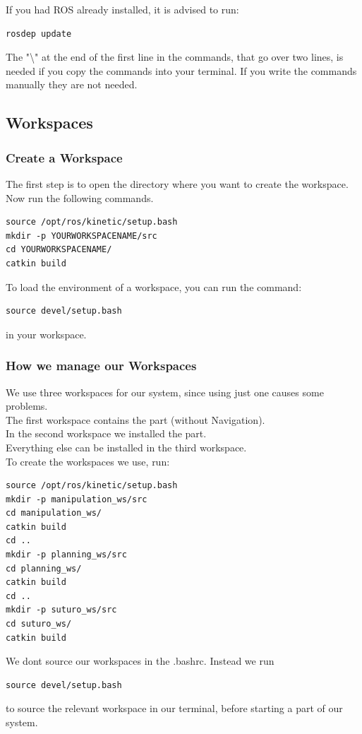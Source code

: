 \documentclass[main.tex]{subfiles}
\begin{document}
If you had ROS already installed, it is advised to run:
\begin{lstlisting}
rosdep update
\end{lstlisting}
The "\textbackslash" at the end of the first line in the commands, that go over two lines, is needed if you copy the commands into your terminal. If you write the commands manually they are not needed.
	
	\subsection{Workspaces}
	\subsubsection{Create a Workspace}
	The first step is to open the directory where you want to create the workspace.\\
	Now run the following commands.
	\begin{lstlisting}
source /opt/ros/kinetic/setup.bash
mkdir -p YOURWORKSPACENAME/src
cd YOURWORKSPACENAME/
catkin build 
\end{lstlisting}
	
	To load the environment of a workspace, you can run the command:
	\begin{lstlisting}
source devel/setup.bash
\end{lstlisting}
	in your workspace.
	
	\subsubsection{How we manage our Workspaces} \label{workspace_management}
	
	We use three workspaces for our system, since using just one causes some problems.\\
	The first workspace contains the  part (without Navigation).\\
	In the second workspace we installed the  part.\\
	Everything else can be installed in the third workspace.\\
	To create the workspaces we use, run:\\
	\begin{lstlisting}
source /opt/ros/kinetic/setup.bash
mkdir -p manipulation_ws/src
cd manipulation_ws/
catkin build 
cd ..
mkdir -p planning_ws/src
cd planning_ws/
catkin build 
cd ..
mkdir -p suturo_ws/src
cd suturo_ws/
catkin build 
\end{lstlisting}
	
	We dont source our workspaces in the .bashrc. Instead we run\\
	\begin{lstlisting}
source devel/setup.bash
\end{lstlisting}
to source the relevant workspace in our terminal, before starting a part of our system.
	
\end{document}
